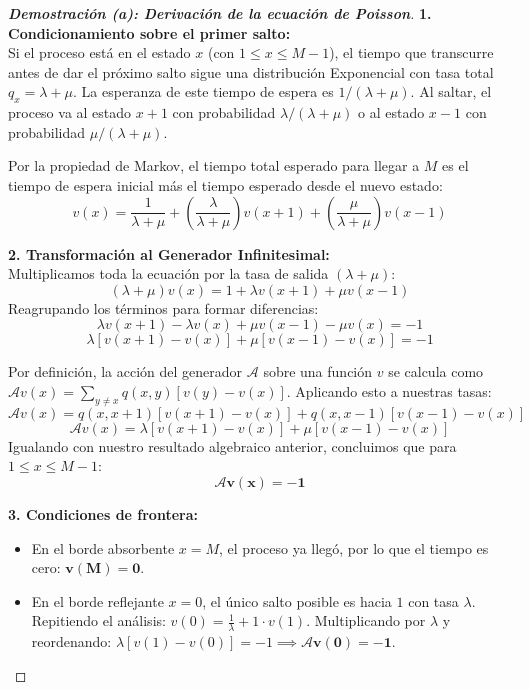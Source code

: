 \documentclass[10pt,a4paper]{article}
\begin{document}
\begin{proof}[\textbf{Demostración (a): Derivación de la ecuación de Poisson}]
    \textbf{1. Condicionamiento sobre el primer salto:} \\
    Si el proceso está en el estado $x$ (con $1 \le x \le M-1$), el tiempo que transcurre antes de dar el próximo salto sigue una distribución Exponencial con tasa total $q_x = \lambda + \mu$. La esperanza de este tiempo de espera es $1/(\lambda+\mu)$. 
    Al saltar, el proceso va al estado $x+1$ con probabilidad $\lambda/(\lambda+\mu)$ o al estado $x-1$ con probabilidad $\mu/(\lambda+\mu)$.
    
    Por la propiedad de Markov, el tiempo total esperado para llegar a $M$ es el tiempo de espera inicial más el tiempo esperado desde el nuevo estado:
    \[ v(x) = \frac{1}{\lambda+\mu} + \left( \frac{\lambda}{\lambda+\mu} \right) v(x+1) + \left( \frac{\mu}{\lambda+\mu} \right) v(x-1) \]
    
    \textbf{2. Transformación al Generador Infinitesimal:} \\
    Multiplicamos toda la ecuación por la tasa de salida $(\lambda+\mu)$:
    \[ (\lambda+\mu) v(x) = 1 + \lambda v(x+1) + \mu v(x-1) \]
    Reagrupando los términos para formar diferencias:
    \[ \lambda v(x+1) - \lambda v(x) + \mu v(x-1) - \mu v(x) = -1 \]
    \[ \lambda [v(x+1) - v(x)] + \mu [v(x-1) - v(x)] = -1 \]
    
    Por definición, la acción del generador $\mathcal{A}$ sobre una función $v$ se calcula como $\mathcal{A}v(x) = \sum_{y \neq x} q(x,y)[v(y) - v(x)]$. Aplicando esto a nuestras tasas:
    \[ \mathcal{A}v(x) = q(x,x+1)[v(x+1) - v(x)] + q(x,x-1)[v(x-1) - v(x)] \]
    \[ \mathcal{A}v(x) = \lambda[v(x+1) - v(x)] + \mu[v(x-1) - v(x)] \]
    Igualando con nuestro resultado algebraico anterior, concluimos que para $1 \le x \le M-1$:
    \[ \mathbf{\mathcal{A}v(x) = -1} \]
    
    \textbf{3. Condiciones de frontera:}
    \begin{itemize}
        \item En el borde absorbente $x=M$, el proceso ya llegó, por lo que el tiempo es cero: $\mathbf{v(M) = 0}$.
        \item En el borde reflejante $x=0$, el único salto posible es hacia $1$ con tasa $\lambda$. Repitiendo el análisis: $v(0) = \frac{1}{\lambda} + 1 \cdot v(1)$. Multiplicando por $\lambda$ y reordenando: $\lambda[v(1) - v(0)] = -1 \implies \mathbf{\mathcal{A}v(0) = -1}$.
    \end{itemize}
\end{proof}
\end{document}

